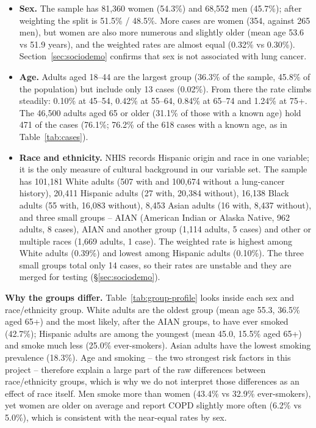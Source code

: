 \begin{itemize}
  \item \textbf{Sex.} The sample has 81,360 women (54.3\%) and 68,552 men (45.7\%); after weighting the split is 51.5\% / 48.5\%. More cases are women (354, against 265 men), but women are also more numerous and slightly older (mean age 53.6 vs 51.9 years), and the weighted rates are almost equal (0.32\% vs 0.30\%). Section~\ref{sec:sociodemo} confirms that sex is not associated with lung cancer.
  \item \textbf{Age.} Adults aged 18--44 are the largest group (36.3\% of the sample, 45.8\% of the population) but include only 13 cases (0.02\%). From there the rate climbs steadily: 0.10\% at 45--54, 0.42\% at 55--64, 0.84\% at 65--74 and 1.24\% at 75+. The 46,500 adults aged 65 or older (31.1\% of those with a known age) hold 471 of the \nCases cases (76.1\%; 76.2\% of the 618 cases with a known age, as in Table~\ref{tab:cases}).
  \item \textbf{Race and ethnicity.} NHIS records Hispanic origin and race in one variable; it is the only measure of cultural background in our variable set. The sample has 101,181 White adults (507 with and 100,674 without a lung-cancer history), 20,411 Hispanic adults (27 with, 20,384 without), 16,138 Black adults (55 with, 16,083 without), 8,453 Asian adults (16 with, 8,437 without), and three small groups -- AIAN (American Indian or Alaska Native, 962 adults, 8 cases), AIAN and another group (1,114 adults, 5 cases) and other or multiple races (1,669 adults, 1 case). The weighted rate is highest among White adults (0.39\%) and lowest among Hispanic adults (0.10\%). The three small groups total only 14 cases, so their rates are unstable and they are merged for testing (\S\ref{sec:sociodemo}).
\end{itemize}

\textbf{Why the groups differ.} Table~\ref{tab:group-profile} looks inside each sex and race/ethnicity group. White adults are the oldest group (mean age 55.3, 36.5\% aged 65+) and the most likely, after the AIAN groups, to have ever smoked (42.7\%); Hispanic adults are among the youngest (mean 45.0, 15.5\% aged 65+) and smoke much less (25.0\% ever-smokers). Asian adults have the lowest smoking prevalence (18.3\%). Age and smoking -- the two strongest risk factors in this project -- therefore explain a large part of the raw differences between race/ethnicity groups, which is why we do not interpret those differences as an effect of race itself. Men smoke more than women (43.4\% vs 32.9\% ever-smokers), yet women are older on average and report COPD slightly more often (6.2\% vs 5.0\%), which is consistent with the near-equal rates by sex.

